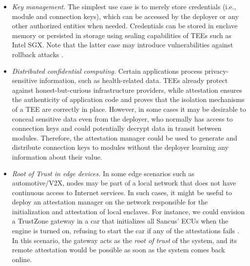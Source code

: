 \begin{itemize}
  \item \textit{Key management.} The simplest use case is to merely store
  credentials (i.e., module and connection keys), which can be accessed by the
  deployer or any other authorized entities when needed. Credentials can be
  stored in enclave memory or persisted in storage using sealing capabilities of
  \acp{TEE} such as Intel \ac{SGX}. Note that the latter case may introduce
  vulnerabilities against rollback attacks \cite{alder2018migrating}.
  \item \textit{Distributed confidential computing.} Certain applications
  process privacy-sensitive information, such as health-related
  data. \acp{TEE} already protect against honest-but-curious infrastructure
  providers, while attestation ensures the authenticity of application code and
  proves that the isolation mechanisms of a \ac{TEE} are correctly in place.
  However, in some cases it may be desirable to conceal sensitive data even from
  the deployer, who normally has access to connection keys and could potentially
  decrypt data in transit between modules. Therefore, the attestation manager
  could be used to generate and distribute connection keys to modules without
  the deployer learning any information about their value.
  \item \textit{Root of Trust in edge devices.} In some edge scenarios such as
  automotive/\ac{V2X}, nodes may be part of a local network
  that does not have continuous access to Internet services. In such cases, it
  might be useful to deploy an attestation manager on the network responsible
  for the initialization and attestation of local enclaves. For instance, we
  could envision a TrustZone gateway in a car that initializes all Sancus'
  \acp{ECU} when the engine is turned on, refusing to start the car if any of
  the attestations fails \cite{vanbulck_2017vulcan}. In this scenario, the
  gateway acts as the \textit{root of trust} of the system, and its remote
  attestation would be possible as soon as the system comes back online.
\end{itemize}

